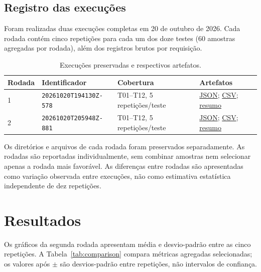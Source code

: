 \documentclass[12pt,a4paper]{article}
\begin{document}
\subsection{Registro das execuções}

Foram realizadas duas execuções completas em 20 de outubro de 2026. Cada rodada contém
cinco repetições para cada um dos doze testes (60 amostras agregadas por rodada), além dos
registros brutos por requisição.

\begin{table}[H]
\centering
\small
\caption{Execuções preservadas e respectivos artefatos.}
\begin{tabularx}{\textwidth}{@{}l l l X@{}}
\toprule
Rodada & Identificador & Cobertura & Artefatos\\
\midrule
1 & \texttt{20261020T194130Z-578} & T01--T12, 5 repetições/teste &
\href{results/20261020T194130Z-578/results.json}{JSON};
\href{results/20261020T194130Z-578/results.csv}{CSV};
\href{results/20261020T194130Z-578/plots/summary.md}{resumo}\\
2 & \texttt{20261020T205948Z-881} & T01--T12, 5 repetições/teste &
\href{results/20261020T205948Z-881/results.json}{JSON};
\href{results/20261020T205948Z-881/results.csv}{CSV};
\href{results/20261020T205948Z-881/plots/summary.md}{resumo}\\
\bottomrule
\end{tabularx}
\end{table}

Os diretórios e arquivos de cada rodada foram preservados separadamente. As rodadas são
reportadas individualmente, sem combinar amostras nem selecionar apenas a rodada mais
favorável. As diferenças entre rodadas são apresentadas como variação observada entre
execuções, não como estimativa estatística independente de dez repetições.

\section{Resultados}

Os gráficos da segunda rodada apresentam média e desvio-padrão entre as cinco repetições.
A Tabela~\ref{tab:comparison} compara métricas agregadas selecionadas; os valores após
$\pm$ são desvios-padrão entre repetições, não intervalos de confiança.
\end{document}
